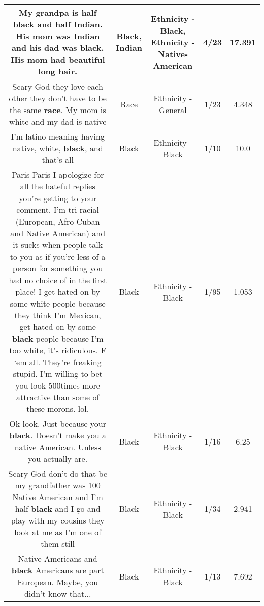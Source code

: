 \documentclass[11pt]{article}
\newlength\mylength
\begin{document}
\begin{center}
\begin{longtable}{|C{.65\mylength}|C{.30\mylength}|C{.12\mylength}|C{.12\mylength}|C{.12\mylength}|}
  \small My grandpa is half \textbf{black} and half \textbf{Indian}. His mom was \textbf{Indian} and his dad was \textbf{black}. His mom had beautiful long hair.\normalsize   & Black, Indian & Ethnicity - Black, Ethnicity - Native-American & 4/23 & 17.391 \\  \hline
  \small Scary God they love each other they don't have to be the same \textbf{race}. My mom is white and my dad is native\normalsize   & Race & Ethnicity - General & 1/23 & 4.348 \\  \hline
  \small I'm latino meaning having native, white, \textbf{black}, and that's all\normalsize   & Black & Ethnicity - Black & 1/10 & 10.0 \\  \hline
  \small Paris Paris I apologize for all the hateful replies you're getting to your comment. I'm tri-racial (European, Afro Cuban and Native American) and it sucks when people talk to you as if you're less of a person for something you had no choice of in the first place! I get hated on by some white people because they think I'm Mexican, get hated on by some \textbf{black} people because I'm too white, it's ridiculous. F ‘em all. They're freaking stupid. I'm willing to bet you look 500times more attractive than some of these morons. lol.\normalsize   & Black & Ethnicity - Black & 1/95 & 1.053 \\  \hline
  \small Ok look. Just because your \textbf{black}. Doesn't make you a native American. Unless you actually are.\normalsize   & Black & Ethnicity - Black & 1/16 & 6.25 \\  \hline
  \small Scary God don't do that bc my grandfather was 100 Native American  and I'm half \textbf{black} and I go and play with my cousins they look at me as I'm one of them still\normalsize   & Black & Ethnicity - Black & 1/34 & 2.941 \\  \hline
  \small Native Americans and \textbf{black} Americans are part European.  Maybe, you didn't know that...\normalsize   & Black & Ethnicity - Black & 1/13 & 7.692 \\  \hline

\end{longtable}
\end{center}
\end{document}
